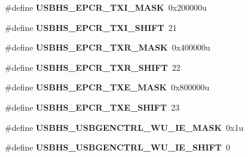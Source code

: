 \begin{DoxyCompactItemize}
\item 
\hypertarget{group___u_s_b_h_s___register___masks_ga413d0140dabd4836ff3d49072989da2a}{}\#define {\bfseries U\+S\+B\+H\+S\+\_\+\+E\+P\+C\+R\+\_\+\+T\+X\+I\+\_\+\+M\+A\+S\+K}~0x200000u\label{group___u_s_b_h_s___register___masks_ga413d0140dabd4836ff3d49072989da2a}

\item 
\hypertarget{group___u_s_b_h_s___register___masks_ga887223fc068b5547b270281ab69876ec}{}\#define {\bfseries U\+S\+B\+H\+S\+\_\+\+E\+P\+C\+R\+\_\+\+T\+X\+I\+\_\+\+S\+H\+I\+F\+T}~21\label{group___u_s_b_h_s___register___masks_ga887223fc068b5547b270281ab69876ec}

\item 
\hypertarget{group___u_s_b_h_s___register___masks_ga4257baf6dcd8e999eb144f2b4b066c52}{}\#define {\bfseries U\+S\+B\+H\+S\+\_\+\+E\+P\+C\+R\+\_\+\+T\+X\+R\+\_\+\+M\+A\+S\+K}~0x400000u\label{group___u_s_b_h_s___register___masks_ga4257baf6dcd8e999eb144f2b4b066c52}

\item 
\hypertarget{group___u_s_b_h_s___register___masks_ga814fd09684d7313758dc39a5008a5402}{}\#define {\bfseries U\+S\+B\+H\+S\+\_\+\+E\+P\+C\+R\+\_\+\+T\+X\+R\+\_\+\+S\+H\+I\+F\+T}~22\label{group___u_s_b_h_s___register___masks_ga814fd09684d7313758dc39a5008a5402}

\item 
\hypertarget{group___u_s_b_h_s___register___masks_ga13fed39aa8b96da9091dfbffbf0bada1}{}\#define {\bfseries U\+S\+B\+H\+S\+\_\+\+E\+P\+C\+R\+\_\+\+T\+X\+E\+\_\+\+M\+A\+S\+K}~0x800000u\label{group___u_s_b_h_s___register___masks_ga13fed39aa8b96da9091dfbffbf0bada1}

\item 
\hypertarget{group___u_s_b_h_s___register___masks_ga2d4d5f8e1eb9fceb8c82a0a93a3eb9b1}{}\#define {\bfseries U\+S\+B\+H\+S\+\_\+\+E\+P\+C\+R\+\_\+\+T\+X\+E\+\_\+\+S\+H\+I\+F\+T}~23\label{group___u_s_b_h_s___register___masks_ga2d4d5f8e1eb9fceb8c82a0a93a3eb9b1}

\item 
\hypertarget{group___u_s_b_h_s___register___masks_ga9df4a64f373d1940fc9b6f6cb8a25d6c}{}\#define {\bfseries U\+S\+B\+H\+S\+\_\+\+U\+S\+B\+G\+E\+N\+C\+T\+R\+L\+\_\+\+W\+U\+\_\+\+I\+E\+\_\+\+M\+A\+S\+K}~0x1u\label{group___u_s_b_h_s___register___masks_ga9df4a64f373d1940fc9b6f6cb8a25d6c}

\item 
\hypertarget{group___u_s_b_h_s___register___masks_ga3378b1f890d6fbb6560ada3863b0405d}{}\#define {\bfseries U\+S\+B\+H\+S\+\_\+\+U\+S\+B\+G\+E\+N\+C\+T\+R\+L\+\_\+\+W\+U\+\_\+\+I\+E\+\_\+\+S\+H\+I\+F\+T}~0\label{group___u_s_b_h_s___register___masks_ga3378b1f890d6fbb6560ada3863b0405d}


\end{DoxyCompactItemize}
